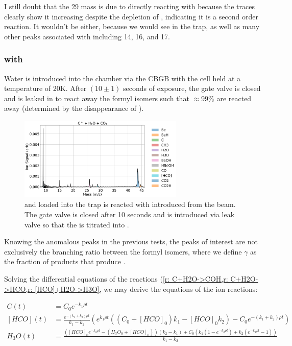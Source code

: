 I still doubt that the 29 mass is due to  directly reacting with  because the traces clearly show it increasing despite the depletion of , indicating it is a second order reaction. It wouldn't be  either, because we would see  in the trap, as well as many other peaks associated with  including 14, 16, and 17.

\subsubsection{ with }
Water is introduced into the chamber via the CBGB with the cell held at a temperature of 20K. After $(10 \pm 1)$ seconds of exposure, the gate valve is closed and  is leaked in to react away the formyl isomers such that $\approx 99\%$ are reacted away (determined by the disappearance of ).

\begin{figure}[H]
	\centering
	\includegraphics[width=0.7\textwidth]{images/C_H2O_CO2_titration_TOF.png}
	\caption{ and  loaded into the trap is reacted with  introduced from the beam. The gate valve is closed after 10 seconds and  is introduced via leak valve so that the  is titrated into .}
\end{figure}

Knowing the anomalous peaks in the previous tests, the peaks of interest are not exclusively the branching ratio between the formyl isomers, where we define $\gamma$ as the fraction of products that produce .

Solving the differential equations of the  reactions (\cref{r: C+H2O->COH,r: C+H2O->HCO,r: [HCO]+H2O->H3O}, we may derive the equations of the ion reactions:

\begin{align}
	C(t) & = C_0 e^{-k_1 \rho t} \label{eq: C(t)+H2O} \\
	[HCO](t) & = \frac{e^{-(k_1 + k_2) \rho t}}{k_1 - k_2} \left(e^{k_1 \rho t}((C_0 + [HCO]_0)k_1 - [HCO]_0 k_2) - C_0 e^{-(k_1 + k_2) \rho t}\right) \label{eq: C+H2O->[HCO](t)} \\
	H_3O(t) & = \frac{\left([HCO]_0 e^{-k_2 \rho t} - (H_3O_0 + [HCO]_0) \right)(k_2 - k_1) + C_0\left( k_1 \left(1 - e^{-k_2 \rho t}\right) + k_2 \left(e^{-k_1 \rho t} - 1\right) \right)}{k_1 - k_2} \label{eq: [HCO]+H2O->H3O(t)}
\end{align}

